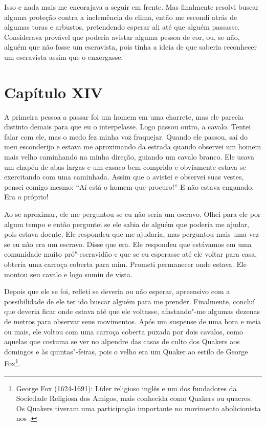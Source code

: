 Isso e nada mais me encorajava a seguir em frente. Mas finalmente
resolvi buscar alguma proteção contra a inclemência do clima, então me
escondi atrás de algumas toras e arbustos, pretendendo esperar ali até
que alguém passasse. Considerava provável que poderia avistar alguma
pessoa de cor, ou, se não, alguém que não fosse um escravista, pois
tinha a ideia de que saberia reconhecer um escravista assim que o
enxergasse.

\chapter{Capítulo XIV}

A primeira pessoa a passar foi um homem em uma charrete, mas ele parecia
distinto demais para que eu o interpelasse. Logo passou outro, a cavalo.
Tentei falar com ele, mas o medo fez minha voz fraquejar. Quando ele
passou, saí do meu esconderijo e estava me aproximando da estrada quando
observei um homem mais velho caminhando na minha direção, guiando um
cavalo branco. Ele usava um chapéu de abas largas e um casaco bem
comprido e obviamente estava se exercitando com uma caminhada. Assim que
o avistei e observei suas vestes, pensei comigo mesmo: ``Aí está o homem
que procuro!'' E não estava enganado. Era o próprio!

Ao se aproximar, ele me perguntou se eu não seria um escravo. Olhei para
ele por algum tempo e então perguntei se ele sabia de alguém que poderia
me ajudar, pois estava doente. Ele respondeu que me ajudaria, mas
perguntou mais uma vez se eu não era um escravo. Disse que era. Ele
respondeu que estávamos em uma comunidade muito pró"-escravidão e que se
eu esperasse até ele voltar para casa, obteria uma carroça coberta para
mim. Prometi permanecer onde estava. Ele montou seu cavalo e logo sumiu
de vista.

Depois que ele se foi, refleti se deveria ou não esperar, apreensivo com
a possibilidade de ele ter ido buscar alguém para me prender.
Finalmente, concluí que deveria ficar onde estava até que ele voltasse,
afastando"-me algumas dezenas de metros para observar seus movimentos.
Após um suspense de uma hora e meia ou mais, ele voltou com uma carroça
coberta puxada por dois cavalos, como aquelas que costuma se ver no
alpendre das casas de culto dos Quakers aos domingos e às
quintas"-feiras, pois o velho era um Quaker ao estilo de George
Fox\footnote{George Fox (1624-1691): Líder religioso inglês e um dos
  fundadores da Sociedade Religiosa dos Amigos, mais conhecida como
  Quakers ou quacres. Os Quakers tiveram uma participação importante no
  movimento abolicionista nos .}.

